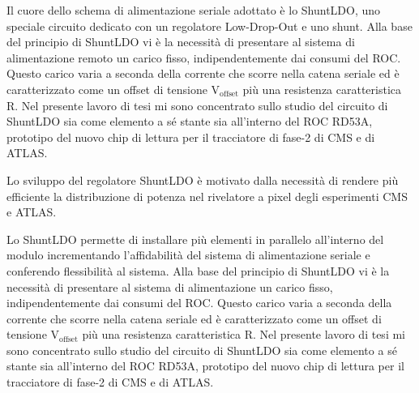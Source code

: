 
Il cuore dello schema di alimentazione seriale adottato \`e lo ShuntLDO, uno speciale circuito dedicato con un regolatore Low-Drop-Out e uno shunt. Alla base del principio di ShuntLDO vi è la necessità di presentare al sistema di alimentazione remoto un carico fisso, indipendentemente dai consumi del ROC. 
Questo carico varia a seconda della corrente che scorre nella catena seriale ed è caratterizzato come un offset di tensione $\mathrm{V_{offset}}$ più una resistenza caratteristica R.
Nel presente lavoro di tesi mi sono concentrato sullo studio del circuito di ShuntLDO sia come elemento a sé stante sia all'interno del ROC RD53A, prototipo del nuovo chip di lettura per il tracciatore di fase-2 di CMS e di ATLAS. 


Lo sviluppo del regolatore ShuntLDO è motivato dalla necessità di rendere più efficiente la distribuzione di potenza nel rivelatore a pixel degli esperimenti CMS e ATLAS.

Lo ShuntLDO permette di installare più elementi in parallelo all'interno del modulo incrementando  l'affidabilità del sistema di alimentazione seriale %
e conferendo  flessibilità al sistema. 
Alla base del principio di ShuntLDO vi è la necessità di presentare al sistema di alimentazione un carico fisso, indipendentemente dai consumi del ROC. 
Questo carico varia a seconda della corrente che scorre nella catena seriale ed è caratterizzato come un offset di tensione $\mathrm{V_{offset}}$ più una resistenza caratteristica R.
Nel presente lavoro di tesi mi sono concentrato sullo studio del circuito di ShuntLDO sia come elemento a sé stante sia all'interno del ROC RD53A, prototipo del nuovo chip di lettura per il tracciatore di fase-2 di CMS e di ATLAS. 

